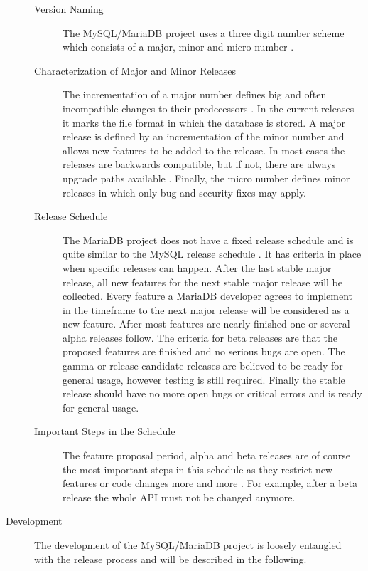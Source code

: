 \begin{description}
\begin{description}
    \item[Version Naming] The MySQL/MariaDB project uses a three digit number
      scheme which consists of a major, minor and micro number
      \cite{MySQLVersion}.

    \item[Characterization of Major and Minor Releases] The incrementation of a
      major number defines big and often incompatible changes to their
      predecessors \cite{MySQLVersion}. In the current releases it marks the
      file format in which the database is stored. A major release is defined
      by an incrementation of the minor number and allows new features to be
      added to the release. In most cases the releases are backwards
      compatible, but if not, there are always upgrade paths available
      \cite{MySQLMariaDB5.1}. Finally, the micro number defines minor releases
      in which only bug and security fixes may apply.

    \item[Release Schedule] The MariaDB project does not have a fixed release
      schedule and is quite similar to the MySQL release schedule
      \cite{MySQLReleaseCriteria,MySQLRoadmap,MySQLPlans}. It has criteria in
      place when specific releases can happen. After the last stable major
      release, all new features for the next stable major release will be
      collected. Every feature a MariaDB developer agrees to implement in the
      timeframe to the next major release will be considered as a new feature.
      After most features are nearly finished one or several alpha releases
      follow. The criteria for beta releases are that the proposed features are
      finished and no serious bugs are open. The gamma or release candidate
      releases are believed to be ready for general usage, however testing is
      still required. Finally the stable release should have no more open bugs
      or critical errors and is ready for general usage.

    \item[Important Steps in the Schedule] The feature proposal period, alpha
      and beta releases are of course the most important steps in this schedule
      as they restrict new features or code changes more and more
      \cite{MySQLReleaseCriteria}. For example, after a beta release the whole
      API must not be changed anymore.

  \end{description}

  \item[Development] The development of the MySQL/MariaDB project is loosely
    entangled with the release process and will be described in the following.


\end{description}
